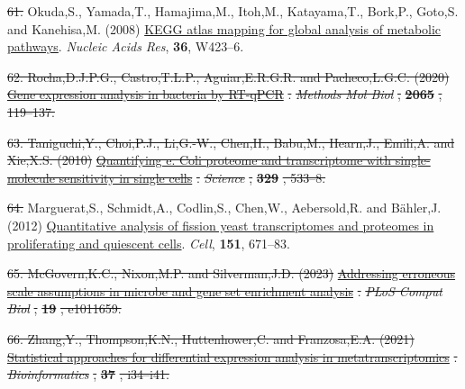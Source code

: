 \documentclass[
]{article}
\newlength{\cslhangindent}
\newenvironment{CSLReferences}[2] %
 {\begin{list}{}{%
  \setlength{\itemindent}{0pt}
  \setlength{\leftmargin}{0pt}
  \setlength{\parsep}{0pt}
  \ifodd #1
   \setlength{\leftmargin}{\cslhangindent}
   \setlength{\itemindent}{-1\cslhangindent}
  \fi
  \setlength{\itemsep}{#2\baselineskip}}}
 {\end{list}}
\providecommand{\DIFadd}[1]{{\protect\color{blue}\uwave{#1}}} %
\providecommand{\DIFdel}[1]{{\protect\color{red}\sout{#1}}}                      %
\providecommand{\DIFaddbegin}{} %
\providecommand{\DIFaddend}{} %
\providecommand{\DIFdelbegin}{} %
\providecommand{\DIFdelend}{} %
\newcommand{\DIFscaledelfig}{0.5}
\newlength{\DIFdelgraphicswidth} %
\newlength{\DIFdelgraphicsheight} %
\newcommand{\DIFaddincludegraphics}[2][]{{\color{blue}\fbox{\DIFOincludegraphics[#1]{#2}}}} %
\newcommand{\DIFdelincludegraphics}[2][]{%
\sbox{\DIFdelgraphicsbox}{\DIFOincludegraphics[#1]{#2}}%
\settoboxwidth{\DIFdelgraphicswidth}{\DIFdelgraphicsbox} %
\settoboxtotalheight{\DIFdelgraphicsheight}{\DIFdelgraphicsbox} %
\scalebox{\DIFscaledelfig}{%
\parbox[b]{\DIFdelgraphicswidth}{\usebox{\DIFdelgraphicsbox}\\[-\baselineskip] \rule{\DIFdelgraphicswidth}{0em}}\llap{\resizebox{\DIFdelgraphicswidth}{\DIFdelgraphicsheight}{%
\setlength{\unitlength}{\DIFdelgraphicswidth}%
\begin{picture}(1,1)%
\thicklines\linethickness{2pt} %
{\color[rgb]{1,0,0}\put(0,0){\framebox(1,1){}}}%
{\color[rgb]{1,0,0}\put(0,0){\line( 1,1){1}}}%
{\color[rgb]{1,0,0}\put(0,1){\line(1,-1){1}}}%
\end{picture}%
}\hspace*{3pt}}} %
} %
\DeclareRobustCommand{\DIFaddbegin}{\DIFOaddbegin \let\includegraphics\DIFaddincludegraphics} %
\DeclareRobustCommand{\DIFaddend}{\DIFOaddend \let\includegraphics\DIFOincludegraphics} %
\DeclareRobustCommand{\DIFdelbegin}{\DIFOdelbegin \let\includegraphics\DIFdelincludegraphics} %
\DeclareRobustCommand{\DIFdelend}{\DIFOaddend \let\includegraphics\DIFOincludegraphics} %
\begin{document}
\begin{CSLReferences}{1}{1}
\DIFdelend {}
\DIFdelbegin \DIFdel{61. }\DIFdelend \DIFaddbegin \DIFadd{54. }\DIFaddend Okuda,S., Yamada,T., Hamajima,M., Itoh,M., Katayama,T., Bork,P.,
Goto,S. and Kanehisa,M. (2008)
\href{https://doi.org/10.1093/nar/gkn282}{KEGG atlas mapping for global
analysis of metabolic pathways}. \emph{Nucleic Acids Res}, \textbf{36},
W423--6.

\DIFdelbegin {}
\DIFdel{62. Rocha,D.J.P.G., Castro,T.L.P., Aguiar,E.R.G.R. and Pacheco,L.G.C.
(2020) }\href{https://doi.org/10.1007/978-1-4939-9833-3_10}{\DIFdel{Gene
expression analysis in bacteria by RT-qPCR}}%
\DIFdel{. }\emph{\DIFdel{Methods Mol Biol}}%
\DIFdel{,
}\textbf{\DIFdel{2065}}%
\DIFdel{, 119--137.
}%

\DIFdel{63. Taniguchi,Y., Choi,P.J., Li,G.-W., Chen,H., Babu,M., Hearn,J.,
Emili,A. and Xie,X.S. (2010)
}\href{https://doi.org/10.1126/science.1188308}{\DIFdel{Quantifying e. Coli
proteome and transcriptome with single-molecule sensitivity in single
cells}}%
\DIFdel{. }\emph{\DIFdel{Science}}%
\DIFdel{, }\textbf{\DIFdel{329}}%
\DIFdel{, 533--8.
}%

\DIFdelend {}
\DIFdelbegin \DIFdel{64. }\DIFdelend \DIFaddbegin \DIFadd{55. }\DIFaddend Marguerat,S., Schmidt,A., Codlin,S., Chen,W., Aebersold,R. and
Bähler,J. (2012)
\href{https://doi.org/10.1016/j.cell.2012.09.019}{Quantitative analysis
of fission yeast transcriptomes and proteomes in proliferating and
quiescent cells}. \emph{Cell}, \textbf{151}, 671--83.

\DIFdelbegin {}
\DIFdel{65. McGovern,K.C., Nixon,M.P. and Silverman,J.D. (2023)
}\href{https://doi.org/10.1371/journal.pcbi.1011659}{\DIFdel{Addressing erroneous
scale assumptions in microbe and gene set enrichment analysis}}%
\DIFdel{.
}\emph{\DIFdel{PLoS Comput Biol}}%
\DIFdel{, }\textbf{\DIFdel{19}}%
\DIFdel{, e1011659.
}%

\DIFdel{66. Zhang,Y., Thompson,K.N., Huttenhower,C. and Franzosa,E.A. (2021)
}\href{https://doi.org/10.1093/bioinformatics/btab327}{\DIFdel{Statistical
approaches for differential expression analysis in metatranscriptomics}}%
\DIFdel{.
}\emph{\DIFdel{Bioinformatics}}%
\DIFdel{, }\textbf{\DIFdel{37}}%
\DIFdel{, i34--i41.
}%


\end{CSLReferences}
\end{document}
